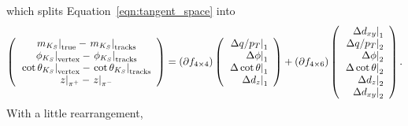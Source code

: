 \documentclass[12pt]{article}
\begin{document}
which splits Equation~\ref{eqn:tangent_space} into
\begin{equation}
\left(\begin{array}{c}
\left.m_{K_S}\right|_{\mbox{\scriptsize true}} - \left.m_{K_S}\right|_{\mbox{\scriptsize tracks}} \\
\left.\phi_{K_S}\right|_{\mbox{\scriptsize vertex}} - \left.\phi_{K_S}\right|_{\mbox{\scriptsize tracks}} \\
\left.\cot\theta_{K_S}\right|_{\mbox{\scriptsize vertex}} - \left.\cot\theta_{K_S}\right|_{\mbox{\scriptsize tracks}} \\
\left.z\right|_{\pi^+} - \left.z\right|_{\pi^-} \\
\end{array}\right) =
\left(\partial f_{4\times 4}\right)
\left(\begin{array}{r}
\left.\Delta q/p_T\right|_1 \\
\left.\Delta \phi\right|_1 \\
\left.\Delta \cot\theta\right|_1 \\
\left.\Delta d_z\right|_1 \\
\end{array}\right) +
\left(\partial f_{4\times 6}\right)
\left(\begin{array}{r}
\left.\Delta d_{xy}\right|_1 \\
\left.\Delta q/p_T\right|_2 \\
\left.\Delta \phi\right|_2 \\
\left.\Delta \cot\theta\right|_2 \\
\left.\Delta d_z\right|_2 \\
\left.\Delta d_{xy}\right|_2 \\
\end{array}\right)\mbox{.}
\end{equation}
With a little rearrangement,
\end{document}
